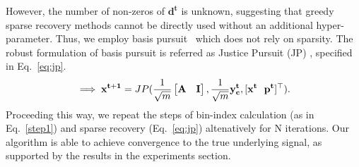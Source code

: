  However, the number of non-zeros of $\mathbf{d^t}$ is unknown, suggesting that greedy sparse recovery methods cannot be directly used without an additional hyper-parameter. Thus, we employ basis pursuit~\cite{candes2006compressive} which does not rely on sparsity. The robust formulation of basis pursuit is referred as Justice Pursuit (JP) \cite{Laska2009}, specified in Eq.~\ref{eq:jp}.
\begin{equation}
\implies \mathbf{{x^{t+1}}} = JP(\frac{1}{\sqrt{m}}\begin{bmatrix} \mathbf{A} & \mathbf{I} \end{bmatrix},\frac{1}{\sqrt{m}}\mathbf{y^t_c},[\mathbf{x^t~~p^t}]^\t).
\label{eq:jp}
\end{equation}
Proceeding this way, we repeat the steps of bin-index calculation (as in Eq.~\ref{step1}) and sparse recovery (Eq.~\ref{eq:jp}) altenatively for $\mathrm{N}$ iterations. Our algorithm is able to achieve convergence to the true underlying signal, as supported by the results in the experiments section.



%
